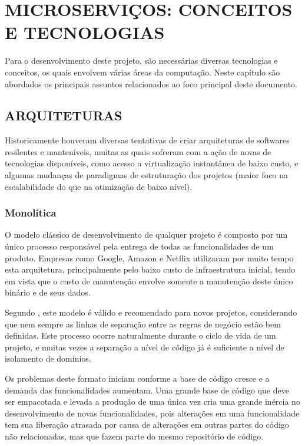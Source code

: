 \chapter{MICROSERVIÇOS: CONCEITOS E TECNOLOGIAS}
\label{chp:tecnologias}

Para o desenvolvimento deste projeto, são necessárias diversas tecnologias e
conceitos, os quais envolvem várias áreas da computação. Neste capítulo são
abordados os principais assuntos relacionados ao foco principal deste documento.

\section{ARQUITETURAS}

Historicamente houveram diversas tentativas de criar arquiteturas de softwares
resilentes e manteníveis, muitas as quais sofreram com a ação de novas de
tecnologias disponíveis, como acesso a virtualização instantânea de baixo custo,
e algumas mudanças de paradigmas de estruturação dos projetos (maior foco na
escalabilidade do que na otimização de baixo nível).

\subsection{Monolítica}

O modelo clássico de desenvolvimento de qualquer projeto é composto por um
único processo responsável pela entrega de todas as funcionalidades de um
produto. Empresas como Google, Amazon e Netflix utilizaram por muito tempo
esta arquitetura, principalmente pelo baixo custo de infraestrutura inicial,
tendo em vista que o custo de manutenção envolve somente a manutenção deste
único binário e de seus dados.

Segundo , este modelo é válido e recomendado para novos
projetos, considerando que nem sempre as linhas de separação entre as regras
de negócio estão bem definidas. Este processo ocorre naturalmente durante o
ciclo de vida de um projeto, e muitas vezes a separação a nível de código já
é suficiente a nível de isolamento de domínios.

Os problemas deste formato iniciam conforme a base de código cresce e a demanda
das funcionalidades aumentam. Uma grande base de código que deve ser empacotada
e levada a produção de uma única vez cria uma grande inércia no desenvolvimento
de novas funcionalidades, pois alterações em uma funcionalidade tem sua
liberação atrasada por causa de alterações em outras partes do código não
relacionadas, mas que fazem parte do mesmo repositório de código.

